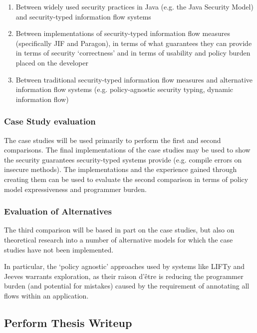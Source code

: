 \begin{enumerate}
	\item Between widely used security practices in Java (e.g. the Java Security Model) and security-typed information flow systems
	
	\item Between implementations of security-typed information flow measures (specifically JIF and Paragon), in terms of what guarantees they can provide in terms of security `correctness' and in terms of usability and policy burden placed on the developer
	
	\item Between traditional security-typed information flow measures and alternative information flow systems (e.g. policy-agnostic security typing, dynamic information flow)
\end{enumerate}

\subsubsection*{Case Study evaluation}

The case studies will be used primarily to perform the first and second comparisons. The final implementations of the case studies may be used to show the security guarantees security-typed systems provide (e.g. compile errors on insecure methods). The implementations and the experience gained through creating them can be used to evaluate the second comparison in terms of policy model expressiveness and programmer burden.

\subsubsection*{Evaluation of Alternatives}

The third comparison will be based in part on the case studies, but also on theoretical research into a number of alternative models for which the case studies have not been implemented.

In particular, the `policy agnostic' approaches used by systems like LIFTy and Jeeves warrants exploration, as their raison d'\^etre is reducing the programmer burden (and potential for mistakes) caused by the requirement of annotating all flows within an application.

\subsection*{Perform Thesis Writeup}

